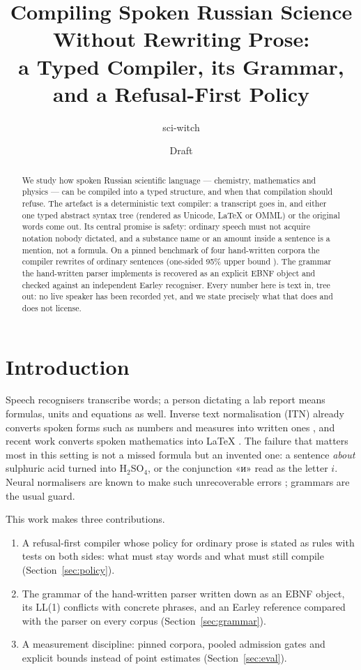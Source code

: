 \documentclass[11pt,a4paper]{article}
\title{Compiling Spoken Russian Science Without Rewriting Prose:\\
a Typed Compiler, its Grammar, and a Refusal-First Policy}
\author{sci-witch}
\date{Draft}
\newcommand{\ru}[1]{\foreignlanguage{russian}{#1}}
\begin{document}
\maketitle

\begin{abstract}
We study how spoken Russian scientific language --- chemistry, mathematics
and physics --- can be compiled into a typed structure, and when that
compilation should refuse. The artefact is a deterministic text compiler:
a transcript goes in, and either one typed abstract syntax tree (rendered as
Unicode, \LaTeX{} or OMML) or the original words come out. Its central
promise is safety: ordinary speech must not acquire notation nobody
dictated, and a substance name or an amount inside a sentence is a mention,
not a formula. On a pinned benchmark of four hand-written corpora the
compiler rewrites \PooledRewrites{} of \PooledOrdinary{} ordinary sentences
(one-sided 95\% upper bound \PooledUpper). The grammar the hand-written
parser implements is recovered as an explicit EBNF object and checked against
an independent Earley recogniser. Every number here is text in, tree out:
no live speaker has been recorded yet, and we state precisely what that does
and does not license.
\end{abstract}

\section{Introduction}
Speech recognisers transcribe words; a person dictating a lab report means
formulas, units and equations as well. Inverse text normalisation (ITN)
already converts spoken forms such as numbers and measures into written ones
\cite{zhang2019neural,zhang2021nemo}, and recent work converts spoken
mathematics into \LaTeX{} \cite{korzh2026speech2latex,hyeon2025mathspeech}.
The failure that matters most in this setting is not a missed formula but an
invented one: a sentence \emph{about} sulphuric acid turned into
H$_2$SO$_4$, or the conjunction \ru{«и»} read as the letter $i$. Neural
normalisers are known to make such unrecoverable errors
\cite{sproat2017rnn,zhang2019neural}; grammars are the usual guard.

This work makes three contributions.
\begin{enumerate}
  \item A refusal-first compiler whose policy for ordinary prose is stated as
        rules with tests on both sides: what must stay words and what must
        still compile (Section~\ref{sec:policy}).
  \item The grammar of the hand-written parser written down as an EBNF object,
        its LL(1) conflicts with concrete phrases, and an Earley reference
        compared with the parser on every corpus (Section~\ref{sec:grammar}).
  \item A measurement discipline: pinned corpora, pooled admission gates and
        explicit bounds instead of point estimates (Section~\ref{sec:eval}).
\end{enumerate}
\end{document}
